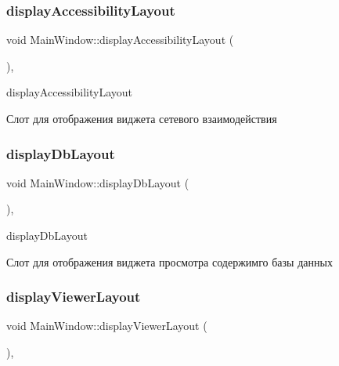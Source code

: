 \subsubsection{\texorpdfstring{display\+Accessibility\+Layout}{displayAccessibilityLayout}}
{\footnotesize\ttfamily void Main\+Window\+::display\+Accessibility\+Layout (\begin{DoxyParamCaption}{ }\end{DoxyParamCaption})\hspace{0.3cm}{\ttfamily [private]}, {\ttfamily [slot]}}



display\+Accessibility\+Layout 

Слот для отображения виджета сетевого взаимодействия \mbox{\label{classMainWindow_ab8b823d0d84f50c5f243720f44471a7f}} 
\subsubsection{\texorpdfstring{display\+Db\+Layout}{displayDbLayout}}
{\footnotesize\ttfamily void Main\+Window\+::display\+Db\+Layout (\begin{DoxyParamCaption}{ }\end{DoxyParamCaption})\hspace{0.3cm}{\ttfamily [private]}, {\ttfamily [slot]}}



display\+Db\+Layout 

Слот для отображения виджета просмотра содержимго базы данных \mbox{\label{classMainWindow_aa9f8c5c52b9f244da93730fa8af5ed34}} 
\subsubsection{\texorpdfstring{display\+Viewer\+Layout}{displayViewerLayout}}
{\footnotesize\ttfamily void Main\+Window\+::display\+Viewer\+Layout (\begin{DoxyParamCaption}{ }\end{DoxyParamCaption})\hspace{0.3cm}{\ttfamily [private]}, {\ttfamily [slot]}}



